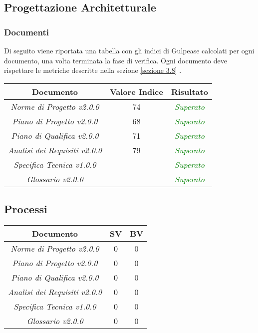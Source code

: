 \subsection{Progettazione Architetturale}
\subsubsection{Documenti}
\label{appendice 3}

Di seguito viene riportata una tabella con gli indici di \gls{Gulpease} calcolati per ogni documento, una volta terminata la fase di verifica. Ogni documento deve rispettare le metriche descritte nella sezione \ref{sezione 3.8} .\\

\hspace{1cm}

\begin{center}
	\begin{tabular}{|c|c|c|}
		\hline 
		\textbf{Documento} & \textbf{Valore Indice} & \textbf{Risultato} \\ 
		\hline
		\textit{Norme di Progetto v2.0.0} & 74 & \textcolor{green}{\textit{Superato}} \\  
		\textit{Piano di Progetto v2.0.0} & 68 & \textcolor{green}{\textit{Superato}} \\ 
		\textit{Piano di Qualifica v2.0.0} & 71 & \textcolor{green}{\textit{Superato}} \\ 
		\textit{Analisi dei Requisiti v2.0.0} & 79 & \textcolor{green}{\textit{Superato}} \\
		\textit{Specifica Tecnica v1.0.0} & & \textcolor{green}{\textit{Superato}} \\ 
		\textit{Glossario v2.0.0} & & \textcolor{green}{\textit{Superato}} \\ 
		\hline 
	\end{tabular}
\end{center}

\subsection{Processi}
\label{appendice 4}
\vspace{3mm}

\begin{center}
	\begin{tabular}{|c|c|c|}
		\toprule
			\textbf{Documento} & \textbf{SV} & \textbf{BV} \\ 
		\midrule
		\midrule
			\textit{Norme di Progetto v2.0.0} & 0 & 0 \\  
			\textit{Piano di Progetto v2.0.0} & 0 & 0 \\ 
			\textit{Piano di Qualifica v2.0.0} & 0 & 0 \\ 
			\textit{Analisi dei Requisiti v2.0.0} & 0 & 0 \\
			\textit{Specifica Tecnica v1.0.0} & 0 & 0 \\ 
			\textit{Glossario v2.0.0} & 0 & 0 \\ 
		\bottomrule
	\end{tabular}
\end{center}